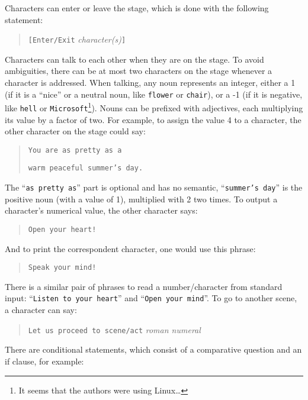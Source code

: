 Characters can enter or leave the stage, which is done with the following statement:

\begin{quotation}
    \texttt{[Enter/Exit} \emph{character(s)}\texttt{]}
\end{quotation}

Characters can talk to each other when they are on the stage. To avoid ambiguities, there can be at most two characters on the stage whenever a character is addressed. When talking, any noun represents an integer, either a 1 (if it is a “nice” or a neutral noun, like \texttt{flower} or \texttt{chair}), or a -1 (if it is negative, like \texttt{hell} or \texttt{Microsoft}\footnote{It seems that the authors were using Linux\dots}). Nouns can be prefixed with adjectives, each multiplying its value by a factor of two. For example, to assign the value 4 to a character, the other character on the stage could say:

\begin{quotation}
    \texttt{You are as pretty as a}

    \texttt{warm peaceful summer's day.}
\end{quotation}

The “\texttt{as pretty as}” part is optional and has no semantic, “\texttt{summer's day}” is the positive noun (with a value of 1), multiplied with 2 two times. To output a character's numerical value, the other character says:

\begin{quotation}
    \texttt{Open your heart!}
\end{quotation}

And to print the correspondent \ascii{} character, one would use this phrase:

\begin{quotation}
    \texttt{Speak your mind!}
\end{quotation}

There is a similar pair of phrases to read a number/character from standard input: “\texttt{Listen to your heart}” and “\texttt{Open your mind}”. To go to another scene, a character can say:

\begin{quotation}
    \texttt{Let us proceed to scene/act} \emph{roman numeral}
\end{quotation}

There are conditional statements, which consist of a comparative question and an if clause, for example:

